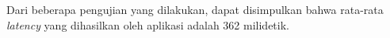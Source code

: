 \begin{enumerate}
\begin{enumerate}
%		
%		
%		
%		
%		
%		
%		
%		
%		
%		
%		
	\end{enumerate}

	Dari beberapa pengujian yang dilakukan, dapat disimpulkan bahwa rata-rata \textit{latency} yang dihasilkan oleh aplikasi adalah 362 milidetik.
\end{enumerate}